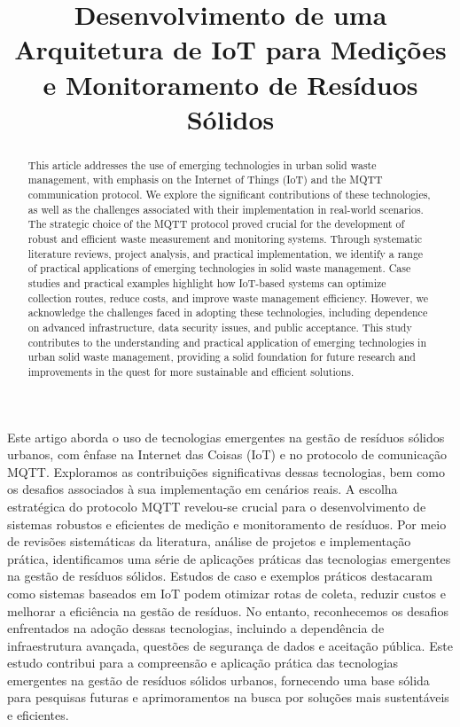 \documentclass[12pt]{article}
\title{Desenvolvimento de uma Arquitetura de IoT para Medições e
Monitoramento de Resíduos Sólidos}
\begin{document}
\maketitle

\begin{abstract}
This article addresses the use of emerging technologies in urban solid waste management, with emphasis on the Internet of Things (IoT) and the MQTT communication protocol. We explore the significant contributions of these technologies, as well as the challenges associated with their implementation in real-world scenarios. The strategic choice of the MQTT protocol proved crucial for the development of robust and efficient waste measurement and monitoring systems. Through systematic literature reviews, project analysis, and practical implementation, we identify a range of practical applications of emerging technologies in solid waste management. Case studies and practical examples highlight how IoT-based systems can optimize collection routes, reduce costs, and improve waste management efficiency. However, we acknowledge the challenges faced in adopting these technologies, including dependence on advanced infrastructure, data security issues, and public acceptance. This study contributes to the understanding and practical application of emerging technologies in urban solid waste management, providing a solid foundation for future research and improvements in the quest for more sustainable and efficient solutions.
\end{abstract}
     
\begin{resumo} 
Este artigo aborda o uso de tecnologias emergentes na gestão de resíduos sólidos urbanos, com ênfase na Internet das Coisas (IoT) e no protocolo de comunicação MQTT. Exploramos as contribuições significativas dessas tecnologias, bem como os desafios associados à sua implementação em cenários reais. A escolha estratégica do protocolo MQTT revelou-se crucial para o desenvolvimento de sistemas robustos e eficientes de medição e monitoramento de resíduos. Por meio de revisões sistemáticas da literatura, análise de projetos e implementação prática, identificamos uma série de aplicações práticas das tecnologias emergentes na gestão de resíduos sólidos. Estudos de caso e exemplos práticos destacaram como sistemas baseados em IoT podem otimizar rotas de coleta, reduzir custos e melhorar a eficiência na gestão de resíduos. No entanto, reconhecemos os desafios enfrentados na adoção dessas tecnologias, incluindo a dependência de infraestrutura avançada, questões de segurança de dados e aceitação pública. Este estudo contribui para a compreensão e aplicação prática das tecnologias emergentes na gestão de resíduos sólidos urbanos, fornecendo uma base sólida para pesquisas futuras e aprimoramentos na busca por soluções mais sustentáveis e eficientes.
\end{resumo}
\end{document}
